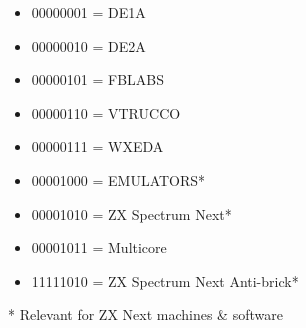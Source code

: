 \begin{itemize}
\item 00000001 = DE1A
\item 00000010 = DE2A
\item 00000101 = FBLABS
\item 00000110 = VTRUCCO
\item 00000111 = WXEDA
\item 00001000 = EMULATORS*
\item 00001010 = ZX Spectrum Next*
\item 00001011 = Multicore
\item 11111010 = ZX Spectrum Next Anti-brick*
\end{itemize}
* Relevant for ZX Next machines \& software

